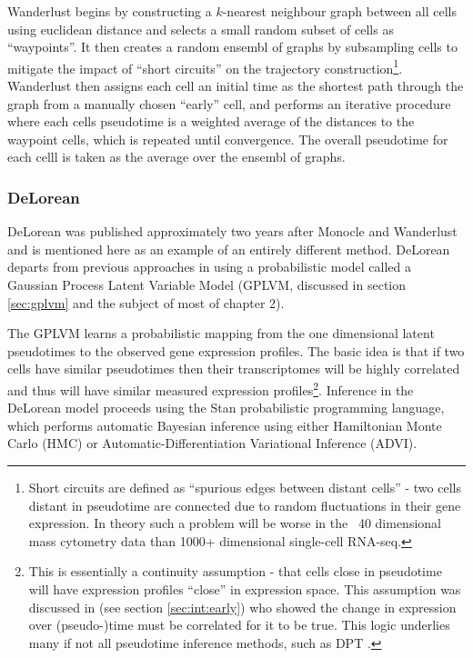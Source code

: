 Wanderlust begins by constructing a $k$-nearest neighbour graph between all cells using euclidean distance and selects a small random subset of cells as ``waypoints''. It then creates a random ensembl of graphs by subsampling cells to mitigate the impact of ``short circuits'' on the trajectory construction\footnote{
Short circuits are defined as ``spurious edges between distant cells'' - two cells distant in pseudotime are connected due to random fluctuations in their gene expression. In theory such a problem will be worse in the ~40 dimensional mass cytometry data than 1000+ dimensional single-cell RNA-seq.
}. Wanderlust then assigns each cell an initial time as the shortest path through the graph from a manually chosen ``early'' cell, and performs an iterative procedure where each cells pseudotime is a weighted average of the distances to the waypoint cells, which is repeated until convergence. The overall pseudotime for each celll is taken as the average over   the ensembl of graphs.

\subsubsection{DeLorean}

DeLorean \cite{reid2016pseudotime} was published approximately two years after Monocle and Wanderlust and is mentioned here as an example of an entirely different method. DeLorean departs from previous approaches in using a probabilistic model called a Gaussian Process Latent Variable Model (GPLVM, discussed in section \ref{sec:gplvm} and the subject of most of chapter 2).

The GPLVM learns a probabilistic mapping from the one dimensional latent pseudotimes to the observed gene expression profiles. The basic idea is that if two cells have similar pseudotimes then their transcriptomes will be highly correlated and thus will have similar measured expression profiles\footnote{
This is essentially a continuity assumption - that cells close in pseudotime will have expression profiles ``close'' in expression space. This assumption was discussed in \cite{Gupta2008-fd} (see section \ref{sec:int:early}) who showed the change in expression over (pseudo-)time must be correlated for it to be true. This logic underlies many if not all pseudotime inference methods, such as DPT \cite{Haghverdi2016-eg}.
}. Inference in the DeLorean model proceeds using the Stan probabilistic programming language, which performs automatic Bayesian inference using either Hamiltonian Monte Carlo (HMC) or Automatic-Differentiation Variational Inference (ADVI).

